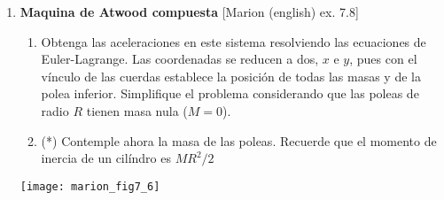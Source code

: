 \documentclass[11pt, spanish, a4paper, twoside]{article}
\begin{document}
\begin{enumerate}
\item
\begin{minipage}[t][6cm]{0.6\textwidth}
\textbf{Maquina de Atwood compuesta} [Marion (english) ex. 7.8]\\ 
\begin{enumerate}
	\item Obtenga las aceleraciones en este sistema resolviendo las ecuaciones de Euler-Lagrange.
	Las coordenadas se reducen a dos, \(x\) e \(y\), pues con el vínculo de las cuerdas establece la posición de todas las masas y de la polea inferior.
	Simplifique el problema considerando que las poleas de radio \(R\) tienen masa nula (\(M=0\)).
	\item (*) Contemple ahora la masa de las poleas.
	Recuerde que el momento de inercia de un cilíndro es \(M R^2/2\)
\end{enumerate}
\end{minipage}
\begin{minipage}[c][0.5em][t]{0.3\textwidth}
	\texttt{[image: marion\_fig7\_6]}
\end{minipage}




\end{enumerate}
\end{document}
